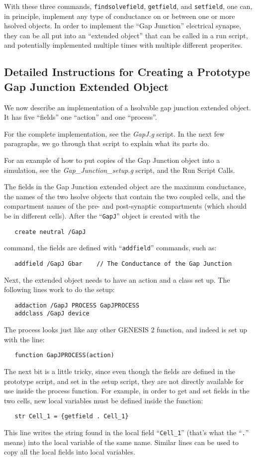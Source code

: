 \documentclass[12pt]{article}
\begin{document}
With these three commands, {\tt findsolvefield}, {\tt getfield}, and {\tt setfield}, one can, in principle, implement any type of conductance on or between one or more hsolved objects. In order to implement the ``Gap Junction'' electrical synapse, they can be all put into an ``extended object'' that can be called in a run script, and potentially implemented multiple times with multiple different properites.

\subsection*{Detailed Instructions for Creating a Prototype Gap Junction Extended Object}

We now describe an implementation of a hsolvable gap junction extended object. It has five ``fields'' one ``action'' and one ``process''.

For the complete implementation, see the {\it GapJ.g} script. In the next few paragraphs, we go through that script to explain what its parts do.

For an example of how to put copies of the Gap Junction object into a simulation, see the {\it Gap\_Junction\_setup.g} script, and the Run Script Calls.

The fields in the Gap Junction extended object are the maximum conductance, the names of the two hsolve objects that contain the two coupled cells, and the compartment names of the pre- and post-synaptic compartments (which should be in different cells). After the ``{\tt GapJ}'' object is created with the
\begin{verbatim}
   create neutral /GapJ
\end{verbatim}
command, the fields are defined with ``{\tt addfield}'' commands, such as:
\begin{verbatim}
   addfield /GapJ Gbar    // The Conductance of the Gap Junction
\end{verbatim}
Next, the extended object needs to have an action and a class set up. The following lines work to do the setup:
\begin{verbatim}
   addaction /GapJ PROCESS GapJPROCESS
   addclass /GapJ device
\end{verbatim}

The process looks just like any other GENESIS 2 function, and indeed is set up with the line:
\begin{verbatim}
   function GapJPROCESS(action)
\end{verbatim}
The next bit is a little tricky, since even though the fields are defined in the prototype script, and set in the setup script, they are not directly available for use inside the process function. For example, in order to get and set fields in the two cells, new local variables must be defined inside the function:
\begin{verbatim}
   str Cell_1 = {getfield . Cell_1}
\end{verbatim}
This line writes the string found in the local field ``{\tt Cell\_1}'' (that's what the ``{\tt .}'' means) into the local variable of the same name. Similar lines can be used to copy all the local fields into local variables.
\end{document}

